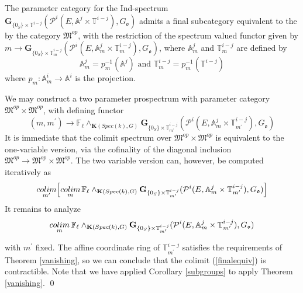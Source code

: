 \documentclass[11pt]{article}
\newcommand\mb{\mathbb}
\newcommand\mc{\mathcal}
\def \bK{\mathbf K}
\newcommand\mfk{\mathbf G}
\begin{document}
The parameter category for the Ind-spectrum $\mfk_{\{ 0 _S\} \times \mb{T}^{i-j}}(\mc{P}^i(E, {\mb{A}^{j}\times 
\mb{T}^{i-j}}), {G}_{\mathfrak{o}}) $ admits a final  subcategory equivalent to the  by the category $\mathfrak{M}^{op}$, with the restriction of the spectrum valued functor  given by $ m \rightarrow \mfk_{\{ 0 _S\} \times \mb{T}^{i-j}_m}(\mc{P}^i(E, {\mb{A}^{j}_m\times \mb{T}^{i-j}_m}), {G}_{\mathfrak{o}})$, where $\mb{A}^j_m$ and $\mb{T}^{i-j}_m $ are defined by 
$$ \mb{A}^j_m = p_m^{-1}(\mb{A}^j ) \mbox{ and } \mb{T}^{i-j}_m = p_m^{-1}(\mb{T}^{i-j} )
$$
where $p_m: \mb{A}^i_m \rightarrow \mb{A}^i$
is the projection.  

We may construct a two parameter prospectrum with parameter category $\mathfrak{M}^{op} \times \mathfrak{M}^{op}$, with defining functor
$$ (m,m^{\prime}) \rightarrow \mb{F}_{\ell} \wedge _{\bK(Spec(k),G)}\mfk_{\{ 0 _S\} \times \mb{T}^{i-j}_{m^{\prime}}}(\mc{P}^i(E, {\mb{A}^{j}_m\times \mb{T}^{i-j}_{m^{\prime}}}), {G}_{\mathfrak{o}})
$$
It is immediate that the colimit spectrum over $\mathfrak{M}^{op} \times \mathfrak{M}^{op}$ is equivalent to the one-variable version, via the cofinality of the diagonal inclusion $\mathfrak{M}^{op} \rightarrow \mathfrak{M}^{op}  \times \mathfrak{M}^{op}  $. The two variable version can, however, be computed iteratively as 
$$\underset{m^{\prime}}{colim}\Big[\underset{m}{colim}\hspace{.05cm} \mb{F}_{\ell} \wedge _{\bK(Spec(k), G)} \mfk_{\{ 0 _S\} \times 
\mb{T}^{i-j}_{m^{\prime}}}(\mc{P}^i(E, {\mb{A}^{j}_m\times \mb{T}^{i-j}_{m^{\prime}}}), {G}_{\mathfrak{o}})\Big]
$$
It remains to analyze 
\begin{equation} \label{finalequiv}
\underset{m}{colim} \mbox{\hspace{.07cm}}
\mb{F}_{\ell}\wedge _{\bK(Spec(k),G)}\mfk_{\{ 0 _S\} \times 
\mb{T}^{i-j}_{m^{\prime}}}(\mc{P}^i(E, {\mb{A}^{j}_m\times \mb{T}^{i-j}_{m^{\prime}}}),  {G}_{\mathfrak{o}})
\end{equation}

with $m^{\prime}$ fixed. The affine coordinate ring of $\mb{T}_{m^{\prime}}^{i-j}$ satisfies the requirements of Theorem \ref{vanishing}, so we can conclude that the colimit (\ref{finalequiv}) is contractible.   Note that we have applied Corollary \ref{subgroups} to apply Theorem \ref{vanishing}.   \qed
\end{document}
